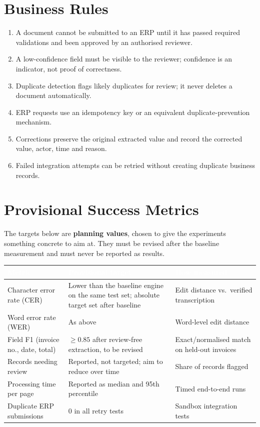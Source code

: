 \documentclass[11pt,a4paper]{report}
\newcommand{\hdr}[1]{\textcolor{white}{\sffamily\bfseries #1}}
\newcommand{\tblstart}{\rowcolors{2}{white}{rowgray}\arrayrulecolor{teal!60}}
\newcommand{\hdrrow}{\rowcolor{navy}}
\begin{document}
\section{Business Rules}
\begin{enumerate}
\item A document cannot be submitted to an ERP until it has passed required validations and been approved by an authorised reviewer.
\item A low-confidence field must be visible to the reviewer; confidence is an indicator, not proof of correctness.
\item Duplicate detection flags likely duplicates for review; it never deletes a document automatically.
\item ERP requests use an idempotency key or an equivalent duplicate-prevention mechanism.
\item Corrections preserve the original extracted value and record the corrected value, actor, time and reason.
\item Failed integration attempts can be retried without creating duplicate business records.
\end{enumerate}

\section{Provisional Success Metrics}
The targets below are \textbf{planning values}, chosen to give the experiments something concrete to aim at. They must be revised after the baseline measurement and must never be reported as results.

{\tblstart\small
\begin{longtable}{L{4.3cm}L{4.4cm}L{4.4cm}}
\hdrrow \hdr{Metric} & \hdr{Provisional target} & \hdr{How measured}\\ \endhead
Character error rate (CER) & Lower than the baseline engine on the same test set; absolute target set after baseline & Edit distance vs.\ verified transcription\\
Word error rate (WER) & As above & Word-level edit distance\\
Field F1 (invoice no., date, total) & $\geq 0.85$ after review-free extraction, to be revised & Exact/normalised match on held-out invoices\\
Records needing review & Reported, not targeted; aim to reduce over time & Share of records flagged\\
Processing time per page & Reported as median and 95th percentile & Timed end-to-end runs\\
Duplicate ERP submissions & 0 in all retry tests & Sandbox integration tests\\
\hline
\end{longtable}}
\end{document}
